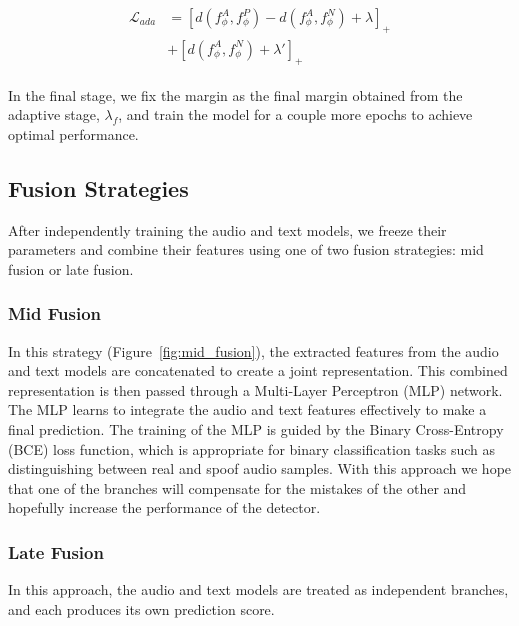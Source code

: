 \documentclass{Interspeech}
\begin{document}
\begin{align}
  \begin{split}
    \mathcal{L}_{ada} & = [d(f_\phi^{A},f_\phi^{P}) - d(f_\phi^{A},f_\phi^{N})+ \lambda]_{+} \\
                      & + [d(f_\phi^{A},f_\phi^{N}) + \lambda']_{+}
  \end{split}
\end{align}

In the final stage, we fix the margin as the final margin obtained from the
adaptive stage, $\lambda_{f}$, and train the model for a couple more epochs to
achieve optimal performance.

\subsection{Fusion Strategies}
After independently training the audio and text models, we freeze their
parameters and combine their features using one of two fusion strategies: mid
fusion or late fusion.

\subsubsection{Mid Fusion}
In this strategy (Figure~\ref{fig:mid_fusion}), the extracted features from the
audio and text models are concatenated to create a joint representation. This
combined representation is then passed through a Multi-Layer Perceptron (MLP)
network. The MLP learns to integrate the audio and text features effectively to
make a final prediction. The training of the MLP is guided by the Binary
Cross-Entropy (BCE) loss function, which is appropriate for binary
classification tasks such as distinguishing between real and spoof audio
samples. With this approach we hope that one of the branches will compensate
for the mistakes of the other and hopefully increase the performance of the
detector.

\subsubsection{Late Fusion}
In this approach, the audio and text models are treated as independent
branches, and each produces its own prediction score.
\end{document}
